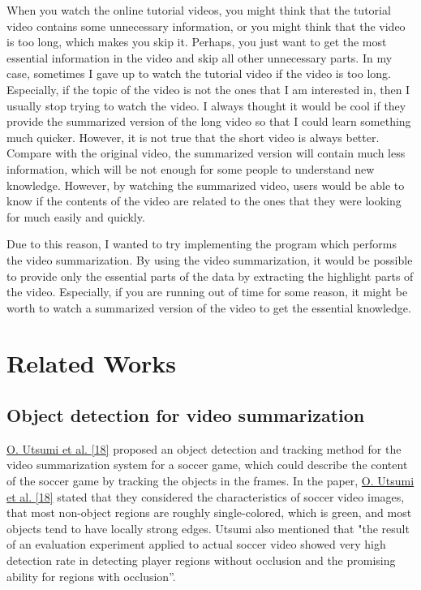 \documentclass{article}
\begin{document}
When you watch the online tutorial videos, you might think that the tutorial video contains some unnecessary information, or you might think that the video is too long, which makes you skip it. Perhaps, you just want to get the most essential information in the video and skip all other unnecessary parts. In my case, sometimes I gave up to watch the tutorial video if the video is too long. Especially, if the topic of the video is not the ones that I am interested in, then I usually stop trying to watch the video. I always thought it would be cool if they provide the summarized version of the long video so that I could learn something much quicker. However, it is not true that the short video is always better. Compare with the original video, the summarized version will contain much less information, which will be not enough for some people to understand new knowledge. However, by watching the summarized video, users would be able to know if the contents of the video are related to the ones that they were looking for much easily and quickly.

Due to this reason, I wanted to try implementing the program which performs the video summarization. By using the video summarization, it would be possible to provide only the essential parts of the data by extracting the highlight parts of the video. Especially, if you are running out of time for some reason, it might be worth to watch a summarized version of the video to get the essential knowledge.

\section{Related Works}

\subsection{Object detection for video summarization}

\hyperlink{ref18}{O. Utsumi et al. [18]} proposed an object detection and tracking method for the video summarization system for a soccer game, which could describe the content of the soccer game by tracking the objects in the frames. In the paper, \hyperlink{ref18}{O. Utsumi et al. [18]} stated that they considered the characteristics of soccer video images, that most non-object regions are roughly single-colored, which is green, and most objects tend to have locally strong edges. Utsumi also mentioned that "the result of an evaluation experiment applied to actual soccer video showed very high detection rate in detecting player regions without occlusion and the promising ability for regions with occlusion”.
\end{document}
